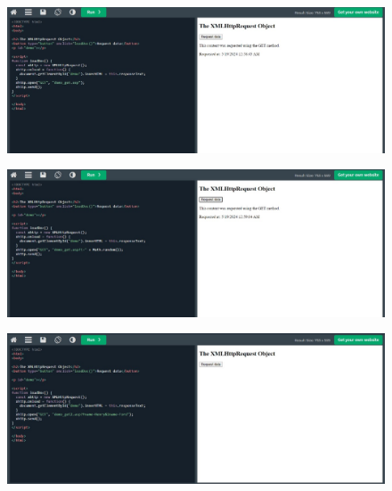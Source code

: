 \documentclass{article}
\begin{document}
\begin{itemize}
\begin{figure}[H]
		\end{figure}
		\begin{figure}[H]
			\centering
			\includegraphics[width=1.0\textwidth,keepaspectratio]{img/L5.jpg}
		\end{figure}
		\begin{figure}[H]
			\centering
			\includegraphics[width=1.0\textwidth,keepaspectratio]{img/L6.jpg}
		\end{figure}
		\begin{figure}[H]
			\centering
			\includegraphics[width=1.0\textwidth,keepaspectratio]{img/L7.jpg}
		\end{figure}
		\begin{figure}[H]

\end{figure}
\end{itemize}
\end{document}
